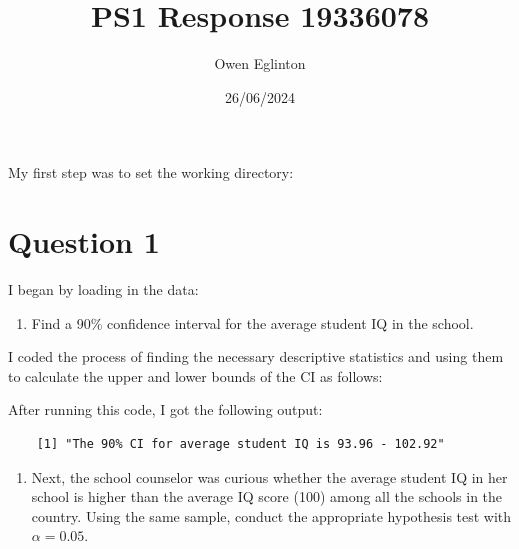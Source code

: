 \documentclass[12pt,letterpaper]{article}
\title{PS1 Response 19336078}
\date{26/06/2024}
\author{Owen Eglinton}
\begin{document}
\maketitle

\vspace{.25cm}

My first step was to set the working directory:



\vspace{.25cm}

\section*{Question 1}

\vspace{.25cm}

I began by loading in the data:

  

\vspace{.25cm}

\begin{enumerate} 
	\item Find a 90\% confidence interval for the average student IQ in the school.
\end{enumerate}

I coded the process of finding the necessary descriptive statistics and using them to calculate the upper and lower bounds of the CI as follows: 

  

After running this code, I got the following output:

\begin{verbatim}
	[1] "The 90% CI for average student IQ is 93.96 - 102.92"
\end{verbatim}

\vspace{.25cm}

\begin{enumerate}
	\setcounter{enumi} 1
	\item Next, the school counselor was curious  whether  the average student IQ in her school is higher than the average IQ score (100) among all the schools in the country. Using the same sample, conduct the appropriate hypothesis test with $\alpha=0.05$.
\end{enumerate}
\end{document}
